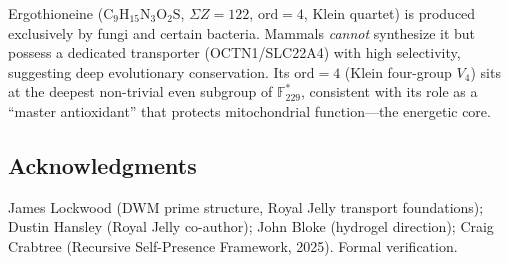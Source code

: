\begin{remark}
Ergothioneine ($\mathrm{C}_9\mathrm{H}_{15}\mathrm{N}_3\mathrm{O}_2\mathrm{S}$,
$\Sigma Z = 122$, $\mathrm{ord} = 4$, Klein quartet) is produced exclusively
by fungi and certain bacteria. Mammals \emph{cannot} synthesize it but
possess a dedicated transporter (OCTN1/SLC22A4) with high selectivity,
suggesting deep evolutionary conservation. Its $\mathrm{ord} = 4$ (Klein
four-group $V_4$) sits at the deepest non-trivial even subgroup of
$\mathbb{F}_{229}^*$, consistent with its role as a ``master antioxidant''
that protects mitochondrial function---the energetic core.
\end{remark}



\subsection*{Acknowledgments}


James Lockwood (DWM prime structure, Royal Jelly transport foundations);
Dustin Hansley (Royal Jelly co-author); John Bloke (hydrogel direction);
Craig Crabtree (Recursive Self-Presence Framework, 2025).
Formal verification.

